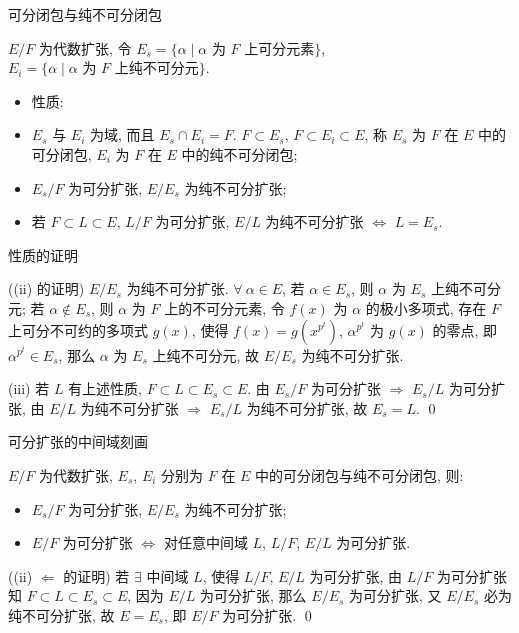 \begin{frame}{可分闭包与纯不可分闭包}

$E/F$ 为代数扩张, 令 $E_s = \{ \alpha \mid \alpha \text{ 为 } F \text{ 上可分元素} \}$,
$E_i = \{ \alpha \mid \alpha \text{ 为 } F \text{ 上纯不可分元} \}$.

\begin{itemize}
\item 性质:
\item[(i)] $E_s$ 与 $E_i$ 为域, 而且 $E_s \cap E_i = F$.
  $F \subset E_s$, $F \subset E_i \subset E$, 称 $E_s$ 为 $F$ 在 $E$ 中的可分闭包,
  $E_i$ 为 $F$ 在 $E$ 中的纯不可分闭包;
\item[(ii)] $E_s/F$ 为可分扩张, $E/E_s$ 为纯不可分扩张;
\item[(iii)] 若 $F \subset L \subset E$, $L/F$ 为可分扩张,
  $E/L$ 为纯不可分扩张 $\iff$ $L = E_s$.
\end{itemize}

\end{frame}


\begin{frame}{性质的证明}

\startproof[bg=yellow, fg=red]((ii) 的证明)
$E/E_s$ 为纯不可分扩张.
$\forall\ \alpha \in E$, 若 $\alpha \in E_s$, 则 $\alpha$ 为 $E_s$ 上纯不可分元;
若 $\alpha \notin E_s$, 则 $\alpha$ 为 $F$ 上的不可分元素,
令 $f(x)$ 为 $\alpha$ 的极小多项式, 存在 $F$ 上可分不可约的多项式 $g(x)$,
使得 $f(x) = g(x^{p^t})$, $\alpha^{p^t}$ 为 $g(x)$ 的零点, 即 $\alpha^{p^t} \in E_s$,
那么 $\alpha$ 为 $E_s$ 上纯不可分元, 故 $E/E_s$ 为纯不可分扩张.

\pause

(iii) 若 $L$ 有上述性质, $F \subset L \subset E_s \subset E$.
由 $E_s/F$ 为可分扩张 $\Longrightarrow$ $E_s/L$ 为可分扩张,
由 $E/L$ 为纯不可分扩张 $\Longrightarrow$ $E_s/L$ 为纯不可分扩张,
故 $E_s = L$.
\qed

\end{frame}


\begin{frame}{可分扩张的中间域刻画}

\begin{lem}[可分扩张的中间域刻画]
$E/F$ 为代数扩张, $E_s$, $E_i$ 分别为 $F$ 在 $E$ 中的可分闭包与纯不可分闭包, 则:
\begin{itemize}
\item[(i)] $E_s/F$ 为可分扩张, $E/E_s$ 为纯不可分扩张;
\item[(ii)] $E/F$ 为可分扩张 $\iff$ 对任意中间域 $L$, $L/F$, $E/L$ 为可分扩张.
\end{itemize}
\end{lem}

\startproof[bg=yellow, fg=red]((ii) $\Longleftarrow$ 的证明)
若 $\exists$ 中间域 $L$, 使得 $L/F$, $E/L$ 为可分扩张,
由 $L/F$ 为可分扩张知 $F \subset L \subset E_s \subset E$,
因为 $E/L$ 为可分扩张, 那么 $E/E_s$ 为可分扩张,
又 $E/E_s$ 必为纯不可分扩张, 故 $E = E_s$,
即 $E/F$ 为可分扩张.
\qed

\end{frame}

